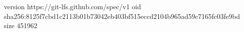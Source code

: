 version https://git-lfs.github.com/spec/v1
oid sha256:8125f7cbd1c2113b01b73042eb403bf515eccd2104b965ad59c7165fc03fe9bd
size 451962
